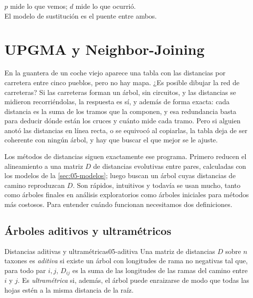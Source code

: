 \begin{ideaclave}
$p$ mide lo que vemos; $d$ mide lo que ocurrió.\\
El modelo de sustitución es el puente entre ambos.
\end{ideaclave}

\section{UPGMA y Neighbor-Joining}\label{sec:05-distancias}

\begin{intuicion}
En la guantera de un coche viejo aparece una tabla con las distancias por carretera entre cinco pueblos, pero no hay mapa. ¿Es posible dibujar la red de carreteras? Si las carreteras forman un árbol, sin circuitos, y las distancias se midieron recorriéndolas, la respuesta es sí, y además de forma exacta: cada distancia es la suma de los tramos que la componen, y esa redundancia basta para deducir dónde están los cruces y cuánto mide cada tramo. Pero si alguien anotó las distancias en línea recta, o se equivocó al copiarlas, la tabla deja de ser coherente con ningún árbol, y hay que buscar el que mejor se le ajuste.
\end{intuicion}

Los métodos de distancias siguen exactamente ese programa. Primero reducen el alineamiento a una matriz $D$ de distancias evolutivas entre pares, calculadas con los modelos de la \cref{sec:05-modelos}; luego buscan un árbol cuyas distancias de camino reproduzcan $D$. Son rápidos, intuitivos y todavía se usan mucho, tanto como árboles finales en análisis exploratorios como árboles iniciales para métodos más costosos. Para entender cuándo funcionan necesitamos dos definiciones.

\subsection{Árboles aditivos y ultramétricos}

\begin{definicion}{Distancias aditivas y ultramétricas}{05-aditiva}
Una matriz de distancias $D$ sobre $n$ taxones es \emph{aditiva} si existe un árbol con longitudes de rama no negativas tal que, para todo par $i,j$, $D_{ij}$ es la suma de las longitudes de las ramas del camino entre $i$ y $j$. Es \emph{ultramétrica} si, además, el árbol puede enraizarse de modo que todas las hojas estén a la misma distancia de la raíz.
\end{definicion}

